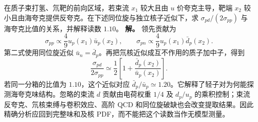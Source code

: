 \begin{exbox}[海夸克不对称的近似读取]
在质子束打氢、氘靶的前向区域，若束流 $x_1$ 较大且由 $u$ 价夸克主导，靶端 $x_2$ 较小且由海夸克提供反夸克。在下述同位旋与独立核子近似下，求 $\sigma_{pd}/(2\sigma_{pp})$ 与海夸克比值的关系，并解释读数 $1.10$。
\textbf{解。} 领先贡献为
\begin{equation*}
 \sigma_{pp}\propto\frac49u_p(x_1)\bar u_p(x_2),\qquad
 \sigma_{pn}\propto\frac49u_p(x_1)\bar d_p(x_2).
\end{equation*}
第二式使用同位旋近似 $\bar u_n=\bar d_p$。再把氘核近似成互不作用的质子加中子，得到
\begin{equation}
 \frac{\sigma_{pd}}{2\sigma_{pp}}
 \simeq\frac12\left[1+\frac{\bar d_p(x_2)}{\bar u_p(x_2)}\right].
 \label{eq:dy-sea-asymmetry-ratio}
\end{equation}
若同一分箱的比值为 $1.10$，这个近似对应 $\bar d_p/\bar u_p\simeq1.20$。它解释了轻子对为何能探测海夸克味结构。忽略的束流 $d$ 贡献由电荷权重 $1/4$ 及 $d_p/u_p$ 的乘积控制；束流反夸克、氘核束缚与卷积效应、高阶 QCD 和同位旋破缺也会改变提取结果。因此精确分析应回到完整味和及核 PDF，而不能把这个读数当作无模型测量。
\end{exbox}
